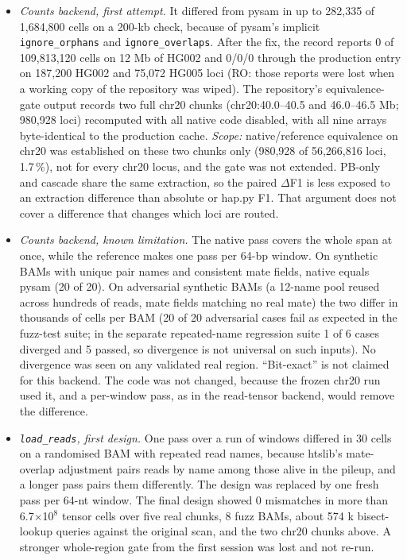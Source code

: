 \documentclass[11pt,a4paper]{article}
\begin{document}
\begin{itemize}[leftmargin=1.6em,itemsep=2pt,topsep=3pt]
\item \emph{Counts backend, first attempt.} It differed from pysam in up to 282,335 of 1,684,800 cells on a 200-kb check, because of pysam's implicit \texttt{ignore\_\allowbreak{}orphans} and \texttt{ignore\_\allowbreak{}overlaps}. After the fix, the record reports 0 of 109,813,120 cells on 12 Mb of HG002 and 0/0/0 through the production entry on 187,200 HG002 and 75,072 HG005 loci (RO: those reports were lost when a working copy of the repository was wiped). The repository's equivalence-gate output records two full chr20 chunks (chr20:40.0--40.5 and 46.0--46.5 Mb; 980,928 loci) recomputed with all native code disabled, with all nine arrays byte-identical to the production cache. \emph{Scope:} native/reference equivalence on chr20 was established on these two chunks only (980,928 of 56,266,816 loci, 1.7\,\%), not for every chr20 locus, and the gate was not extended. PB-only and cascade share the same extraction, so the paired $\Delta$F1 is less exposed to an extraction difference than absolute or hap.py F1. That argument does not cover a difference that changes which loci are routed.
\item \emph{Counts backend, known limitation.} The native pass covers the whole span at once, while the reference makes one pass per 64-bp window. On synthetic BAMs with unique pair names and consistent mate fields, native equals pysam (20 of 20). On adversarial synthetic BAMs (a 12-name pool reused across hundreds of reads, mate fields matching no real mate) the two differ in thousands of cells per BAM (20 of 20 adversarial cases fail as expected in the fuzz-test suite; in the separate repeated-name regression suite 1 of 6 cases diverged and 5 passed, so divergence is not universal on such inputs). No divergence was seen on any validated real region. ``Bit-exact'' is not claimed for this backend. The code was not changed, because the frozen chr20 run used it, and a per-window pass, as in the read-tensor backend, would remove the difference.
\item \emph{\texttt{load\_\allowbreak{}reads}, first design.} One pass over a run of windows differed in 30 cells on a randomised BAM with repeated read names, because htslib's mate-overlap adjustment pairs reads by name among those alive in the pileup, and a longer pass pairs them differently. The design was replaced by one fresh pass per 64-nt window. The final design showed 0 mismatches in more than 6.7$\times$10$^{8}$ tensor cells over five real chunks, 8 fuzz BAMs, about 574 k bisect-lookup queries against the original scan, and the two chr20 chunks above. A stronger whole-region gate from the first session was lost and not re-run.

\end{itemize}
\end{document}
